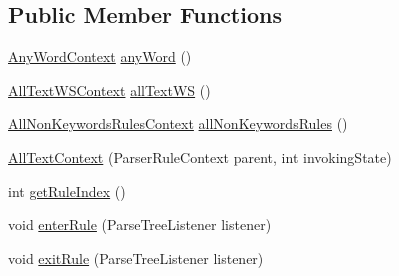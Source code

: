 \subsection*{Public Member Functions}
\begin{DoxyCompactItemize}
\item 
\hyperlink{classgov_1_1nasa_1_1jpf_1_1inspector_1_1client_1_1parser_1_1_console_grammar_parser_1_1_any_word_context}{Any\+Word\+Context} \hyperlink{classgov_1_1nasa_1_1jpf_1_1inspector_1_1client_1_1parser_1_1_console_grammar_parser_1_1_all_text_context_a1f279a82a7fcae4a50dce0f79927c61f}{any\+Word} ()
\item 
\hyperlink{classgov_1_1nasa_1_1jpf_1_1inspector_1_1client_1_1parser_1_1_console_grammar_parser_1_1_all_text_w_s_context}{All\+Text\+W\+S\+Context} \hyperlink{classgov_1_1nasa_1_1jpf_1_1inspector_1_1client_1_1parser_1_1_console_grammar_parser_1_1_all_text_context_abadb41b3f82afa1995a469a3eeaed69e}{all\+Text\+WS} ()
\item 
\hyperlink{classgov_1_1nasa_1_1jpf_1_1inspector_1_1client_1_1parser_1_1_console_grammar_parser_1_1_all_non_keywords_rules_context}{All\+Non\+Keywords\+Rules\+Context} \hyperlink{classgov_1_1nasa_1_1jpf_1_1inspector_1_1client_1_1parser_1_1_console_grammar_parser_1_1_all_text_context_a3d44fd9006682575c484b1356d1a9ef2}{all\+Non\+Keywords\+Rules} ()
\item 
\hyperlink{classgov_1_1nasa_1_1jpf_1_1inspector_1_1client_1_1parser_1_1_console_grammar_parser_1_1_all_text_context_a98c049f7884bed381c384b6bcd0011a7}{All\+Text\+Context} (Parser\+Rule\+Context parent, int invoking\+State)
\item 
int \hyperlink{classgov_1_1nasa_1_1jpf_1_1inspector_1_1client_1_1parser_1_1_console_grammar_parser_1_1_all_text_context_ab76ad2f491728cfbebdaa00232379d22}{get\+Rule\+Index} ()
\item 
void \hyperlink{classgov_1_1nasa_1_1jpf_1_1inspector_1_1client_1_1parser_1_1_console_grammar_parser_1_1_all_text_context_ac46b0708451bef6c6e9cd8bc129dc8be}{enter\+Rule} (Parse\+Tree\+Listener listener)
\item 
void \hyperlink{classgov_1_1nasa_1_1jpf_1_1inspector_1_1client_1_1parser_1_1_console_grammar_parser_1_1_all_text_context_a8b0f287c28c0b51929b96024f616f711}{exit\+Rule} (Parse\+Tree\+Listener listener)
\end{DoxyCompactItemize}
